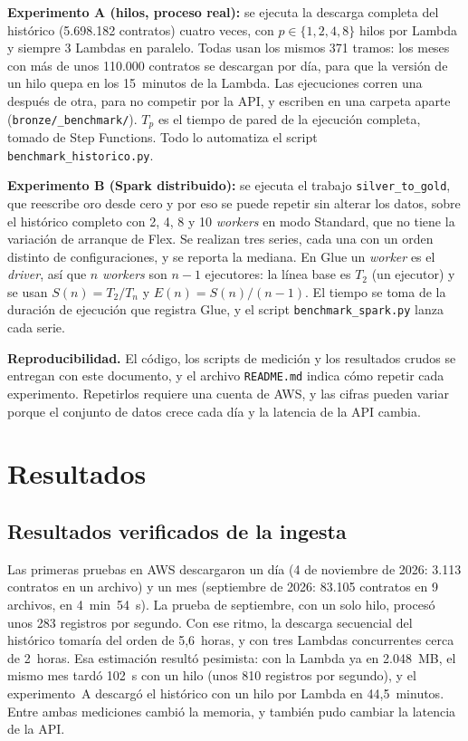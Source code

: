 \documentclass[conference]{IEEEtran}
\begin{document}
\textbf{Experimento A (hilos, proceso real):} se ejecuta la descarga completa del histórico (5.698.182 contratos) cuatro veces, con $p \in \{1, 2, 4, 8\}$ hilos por Lambda y siempre 3 Lambdas en paralelo. Todas usan los mismos 371 tramos: los meses con más de unos 110.000 contratos se descargan por día, para que la versión de un hilo quepa en los 15~minutos de la Lambda. Las ejecuciones corren una después de otra, para no competir por la API, y escriben en una carpeta aparte (\texttt{bronze/\_benchmark/}). $T_p$ es el tiempo de pared de la ejecución completa, tomado de Step Functions. Todo lo automatiza el script \texttt{benchmark\_historico.py}.

\textbf{Experimento B (Spark distribuido):} se ejecuta el trabajo \texttt{silver\_to\_gold}, que reescribe oro desde cero y por eso se puede repetir sin alterar los datos, sobre el histórico completo con 2, 4, 8 y 10 \textit{workers} en modo Standard, que no tiene la variación de arranque de Flex. Se realizan tres series, cada una con un orden distinto de configuraciones, y se reporta la mediana. En Glue un \textit{worker} es el \textit{driver}, así que $n$ \textit{workers} son $n-1$ ejecutores: la línea base es $T_2$ (un ejecutor) y se usan $S(n) = T_2/T_n$ y $E(n) = S(n)/(n-1)$. El tiempo se toma de la duración de ejecución que registra Glue, y el script \texttt{benchmark\_spark.py} lanza cada serie.

\textbf{Reproducibilidad.} El código, los scripts de medición y los resultados crudos se entregan con este documento, y el archivo \texttt{README.md} indica cómo repetir cada experimento. Repetirlos requiere una cuenta de AWS, y las cifras pueden variar porque el conjunto de datos crece cada día y la latencia de la API cambia.

\section{Resultados}

\subsection{Resultados verificados de la ingesta}
Las primeras pruebas en AWS descargaron un día (4 de noviembre de 2026: 3.113 contratos en un archivo) y un mes (septiembre de 2026: 83.105 contratos en 9 archivos, en 4~min~54~s). La prueba de septiembre, con un solo hilo, procesó unos 283 registros por segundo. Con ese ritmo, la descarga secuencial del histórico tomaría del orden de 5,6~horas, y con tres Lambdas concurrentes cerca de 2~horas. Esa estimación resultó pesimista: con la Lambda ya en 2.048~MB, el mismo mes tardó 102~s con un hilo (unos 810 registros por segundo), y el experimento~A descargó el histórico con un hilo por Lambda en 44,5~minutos. Entre ambas mediciones cambió la memoria, y también pudo cambiar la latencia de la API.
\end{document}
